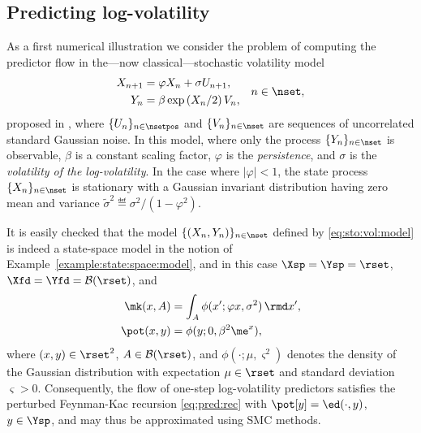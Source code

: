 \subsection{Predicting log-volatility}
\label{sec:stochastic:volatility}

As a first numerical illustration we consider the problem of computing the predictor flow in the---now classical---stochastic volatility model 
\begin{equation} \label{eq:sto:vol:model}
	\begin{split}
		X_{n + 1} &= \varphi X_n + \sigma U_{n + 1}, \\
		Y_n &= \beta \exp \left( X_n / 2 \right) V_n,   
	\end{split}
	\quad n \in \nset, 
\end{equation}
proposed in \cite{hull:white:1987}, where $\{ U_n \}_{n \in \nsetpos}$ and $\{ V_n \}_{n \in \nset}$ are sequences of uncorrelated standard Gaussian noise. In this model, where only the process $\{ Y_n \}_{n \in \nset}$ is observable, $\beta$ is a constant scaling factor, $\varphi$ is the \emph{persistence}, and $\sigma$ is the \emph{volatility of the log-volatility}. In the case where $|\varphi| < 1$, the state process $\{ X_n \}_{n \in \nset}$ is stationary with a Gaussian invariant distribution having zero mean and variance $\tilde{\sigma}^2 \eqdef \sigma^2 / (1 - \varphi^2)$.  

It is easily checked that the model $\{ (X_n, Y_n) \}_{n \in \nset}$ defined by \eqref{eq:sto:vol:model} is indeed a state-space model in the notion of Example~\ref{example:state:space:model}, and in this case $\Xsp = \Ysp = \rset$, $\Xfd = \Yfd = \mathcal{B}(\rset)$, and  
\[
	\begin{split}
		\mk(x, A) &= \int_A \phi(x' ; \varphi x, \sigma^2) \, \rmd x', \\
		\pot(x, y) &= \phi(y ; 0, \beta^2 \me^x),  
	\end{split}
\]
where $(x, y) \in \rset^2$, $A \in \mathcal{B}(\rset)$, and $\phi(\cdot ; \mu, \varsigma^2)$ denotes the density of the Gaussian distribution with expectation $\mu \in \rset$ and standard deviation $\varsigma > 0$. Consequently, the flow of one-step log-volatility predictors satisfies the perturbed Feynman-Kac recursion \eqref{eq:pred:rec} with $\pot[y] = \ed(\cdot, y)$, $y \in \Ysp$, and may thus be approximated using SMC methods. 

